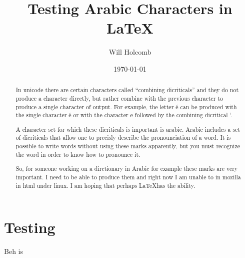 \documentclass[a4paper,twoside]{article}      %
\date{\today}
\title{Testing Arabic Characters in \LaTeX}
\author{Will Holcomb}
\begin{document}
\maketitle

\begin{abstract}
In unicode there are certain characters called ``combining
dicriticals'' and they do not produce a character directly, but rather
combine with the previous character to produce a single character of
output. For example, the letter é can be produced with the single
character é or with the character e followed by the combining
dicritical '.

A character set for which these dicriticals is important is arabic.
Arabic includes a set of dicriticals that allow one to precisly
describe the pronounciation of a word. It is possible to write words
without using these marks apparently, but you must recognize the word
in order to know how to pronounce it.

So, for someone working on a dirctionary in Arabic for example these
marks are very important. I need to be able to produce them and right
now I am unable to in mozilla in html under linux. I am hoping that
perhaps \LaTeX has the ability.

\end{abstract}

\section{Testing}

Beh is 
\end{document}
